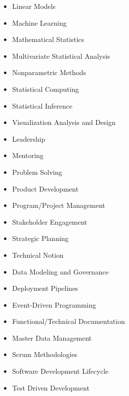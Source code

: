 
\begin{multicols*}{3}
\CompetenciesContinued
{\begin{itemize}
    \item Linear Models
    \item Machine Learning
    \item Mathematical Statistics
    \item Multivariate Statistical Analysis
    \item Nonparametric Methods
    \item Statistical Computing
    \item Statistical Inference
    \item Visualization Analysis and Design
\end{itemize}}

\CompetenciesContinued
{\begin{itemize}
    \item Leadership
    \item Mentoring
    \item Problem Solving
    \item Product Development
    \item Program/Project Management
    \item Stakeholder Engagement
    \item Strategic Planning
    \item Technical Notion
\end{itemize}}

\CompetenciesContinued
{\begin{itemize}
    \item Data Modeling and Governance
    \item Deployment Pipelines
    \item Event-Driven Programming
    \item Functional/Technical Documentation
    \item Master Data Management
    \item Scrum Methodologies
    \item Software Development Lifecycle
    \item Test Driven Development
\end{itemize}}
\end{multicols*}
